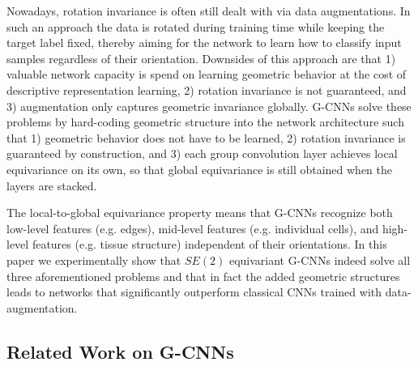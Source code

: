 \documentclass[twocolumn,final]{article}
\begin{document}
Nowadays, rotation invariance is often still dealt with via data augmentations. In such an approach the data is rotated during training time while keeping the target label fixed, thereby aiming for the network to learn how to classify input samples regardless of their orientation. Downsides of this approach are that 1) valuable network capacity is spend on learning geometric behavior at the cost of descriptive representation learning, 2) rotation invariance is not guaranteed, and 3) augmentation only captures geometric invariance globally.
G-CNNs solve these problems by hard-coding geometric structure into the network architecture such that 1) geometric behavior does not have to be learned, 2) rotation invariance is guaranteed by construction, and 3) each group convolution layer achieves local equivariance on its own, so that global equivariance is still obtained when the layers are stacked.

The local-to-global equivariance property means that G-CNNs recognize both low-level features (e.g. edges), mid-level features (e.g. individual cells), and high-level features (e.g. tissue structure) independent of their orientations. In this paper we experimentally show that $SE(2)$ equivariant G-CNNs indeed solve all three aforementioned problems and that in fact the added geometric structures leads to networks that significantly outperform classical CNNs trained with data-augmentation.


\subsection{Related Work on G-CNNs}
\label{relatedWork}
\end{document}
